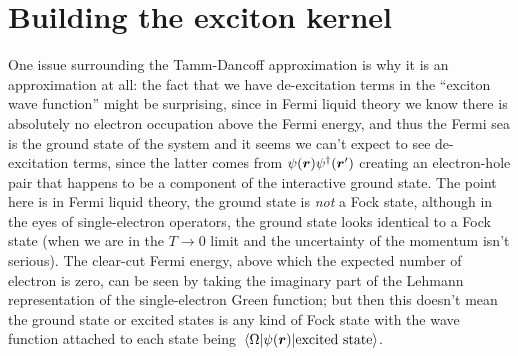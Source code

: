 \documentclass[hyperref, a4paper, 12pt]{report}
\begin{document}
\section{Building the exciton kernel}

One issue surrounding the Tamm-Dancoff approximation 
is why it is an approximation at all:
the fact that we have de-excitation terms in the ``exciton wave function'' 
might be surprising, since in Fermi liquid theory 
we know there is absolutely no electron occupation 
above the Fermi energy, 
and thus the Fermi sea is the ground state of the system 
and it seems we can't expect to see de-excitation terms, 
since the latter comes from $\psi(\vb*{r}) \psi^\dagger(\vb*{r}')$
creating an electron-hole pair that 
happens to be a component of the interactive ground state. 
The point here is in Fermi liquid theory, 
the ground state is \emph{not} a Fock state, 
although in the eyes of single-electron operators, 
the ground state looks identical to a Fock state
(when we are in the $T \to 0$ limit 
and the uncertainty of the momentum isn't serious). 
The clear-cut Fermi energy, 
above which the expected number of electron is zero, 
can be seen by taking the imaginary part of the Lehmann representation 
of the single-electron Green function; 
but then this doesn't mean the ground state 
or excited states
is any kind of Fock state with the wave function 
attached to each state being $\mel{\Omega}{\psi(\vb*{r})}{\text{excited state}}$.
\end{document}
